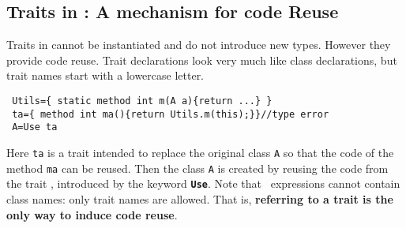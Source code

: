 \saveSpace
\subsection{Traits in \name: A mechanism for code Reuse}
\saveSpace
Traits in \name cannot be instantiated and do not introduce new
types. However they provide code reuse.
Trait declarations 
look very much like class declarations, but trait names 
start with a lowercase letter.

\saveSpace\saveSpace
\begin{lstlisting}
 Utils={ static method int m(A a){return ...} }
 ta={ method int ma(){return Utils.m(this);}}//type error
 A=Use ta
\end{lstlisting}
\saveSpace\saveSpace
\noindent Here \lstinline{ta} is a trait intended to replace the
original class \lstinline{A} so that the code of the method
\lstinline{ma} can be reused. Then the class \lstinline{A} 
is created by reusing the code from the trait \Q@ta@, introduced by the keyword 
{\bf \lstinline{Use}}. Note that \use\ expressions cannot contain class names: only trait
names are allowed.
That is, \textbf{referring to a trait is the only way to induce code reuse}.

